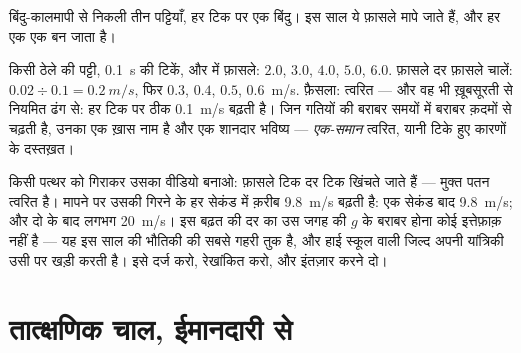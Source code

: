 \begin{omfigure}

{\small बिंदु-कालमापी से निकली तीन पट्टियाँ, हर टिक पर एक बिंदु। इस
साल ये फ़ासले मापे जाते हैं, और हर एक एक  बन जाता है।}
\end{omfigure}

\begin{example}[एक पट्टी, हल करके]\label{ex:g9:uniform-varied-motion:worked}
किसी ठेले की पट्टी, \qty{0.1}{s} की टिकें, और  में फ़ासले:
$2.0$, $3.0$, $4.0$, $5.0$, $6.0$. फ़ासले दर फ़ासले चालें:
$0.02 \div 0.1 = \qty{0.2}{m/s}$, फिर $0.3$, $0.4$, $0.5$,
\qty{0.6}{m/s}. फ़ैसला: त्वरित --- और वह भी ख़ूबसूरती से नियमित ढंग
से:  हर टिक पर ठीक \qty{0.1}{m/s} बढ़ती है। जिन गतियों की  बराबर
समयों में बराबर क़दमों से चढ़ती है, उनका एक ख़ास नाम है और एक शानदार
भविष्य --- \emph{एक-समान} त्वरित, यानी टिके हुए कारणों के दस्तख़त।
\end{example}

\begin{example}\label{ex:g9:uniform-varied-motion:freefall}
किसी पत्थर को गिराकर उसका वीडियो बनाओ: फ़ासले टिक दर टिक खिंचते जाते
हैं --- मुक्त पतन त्वरित है। मापने पर उसकी  गिरने के हर सेकंड
में क़रीब \qty{9.8}{m/s} बढ़ती है: एक सेकंड बाद \qty{9.8}{m/s}; और दो
के बाद लगभग \qty{20}{m/s}। इस बढ़त की दर का उस जगह की $g$ के बराबर
होना कोई इत्तेफ़ाक़ नहीं है --- यह इस साल की भौतिकी की सबसे गहरी तुक है,
और हाई स्कूल वाली जिल्द अपनी यांत्रिकी उसी पर खड़ी करती है। इसे दर्ज
करो, रेखांकित करो, और इंतज़ार करने दो।
\end{example}

\section{तात्क्षणिक चाल, ईमानदारी से}

